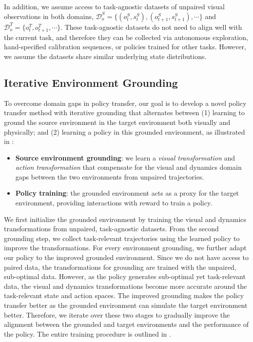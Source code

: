 In addition, we assume access to task-agnostic datasets of unpaired visual observations in both domains, $\mathcal{D}_o^S = \{(o_t^S, s_t^S), (o_{t+1}^S, s_{t+1}^S), \cdots \}$ and $\mathcal{D}_o^T = \{o_t^T, o_{t+1}^T, \cdots \}$. These task-agnostic datasets do not need to align well with the current task, and therefore they can be collected via autonomous exploration, hand-specified calibration sequences, or policies trained for other tasks.  However, we assume the datasets share similar underlying state distributions.



\subsection{Iterative Environment Grounding}
\label{sec:iterative_domain_alignment}
To overcome domain gaps in policy transfer, our goal is to develop a novel policy transfer method with iterative grounding that alternates between (1) learning to ground the source environment in the target environment both visually and physically; and (2) learning a policy in this grounded environment, as illustrated in :
\begin{itemize}
    \item \textbf{Source environment grounding}: we learn a \textit{visual transformation} and \textit{action transformation} that compensate for the visual and dynamics domain gaps between the two environments from unpaired trajectories.
    \item \textbf{Policy training}: the grounded environment acts as a proxy for the target environment, providing interactions with reward to train a policy.
\end{itemize}

We first initialize the grounded environment by training the visual and dynamics transformations from unpaired, task-agnostic datasets. From the second grounding step, we collect task-relevant trajectories using the learned policy to improve the transformations. For every environment grounding, we further adapt our policy to the improved grounded environment.
Since we do not have access to paired data, the transformations for grounding are trained with the unpaired, sub-optimal data. However, as the policy generates sub-optimal yet task-relevant data, the visual and dynamics transformations become more accurate around the task-relevant state and action spaces. The improved grounding makes the policy transfer better as the grounded environment can simulate the target environment better. Therefore, we iterate over these two stages to gradually improve the alignment between the grounded and target environments and the performance of the policy. The entire training procedure is outlined in .


